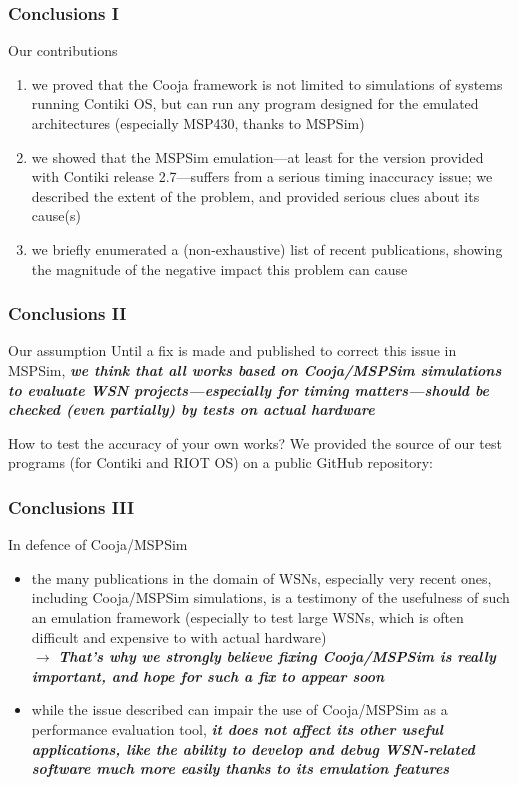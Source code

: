 \documentclass[10pt,c]{beamer}
\renewcommand{\emph}[1]{\textbf{\textit{#1}}}
\begin{document}
\begin{frame}
\frametitle{Conclusions I}
\begin{block}{Our contributions}
\begin{enumerate}
\item we proved that the Cooja framework is not limited to simulations
of systems running Contiki OS, but can run any program designed for the
emulated architectures (especially MSP430, thanks to MSPSim)
\item we showed that the MSPSim emulation---at least for the version
provided with Contiki release 2.7---suffers from a serious timing inaccuracy
issue; we described the extent of the problem, and provided serious clues
about its cause(s)
\item we briefly enumerated a (non-exhaustive) list of recent publications,
showing the magnitude of the negative impact this problem can cause
\end{enumerate}
\end{block}
\end{frame}

\begin{frame}
\frametitle{Conclusions II}
\begin{alertblock}{Our assumption}
Until a fix is made and published to correct this issue in MSPSim,
\emph{we think that all works based on Cooja/MSPSim simulations to evaluate
WSN projects---especially for timing matters---should be checked (even
partially) by tests on actual hardware}
\end{alertblock}
\begin{exampleblock}{How to test the accuracy of your own works?}
We provided the source of our test programs (for Contiki and RIOT OS)
on a public GitHub repository:
\end{exampleblock}
\end{frame}

\begin{frame}
\frametitle{Conclusions III}
\begin{exampleblock}{In defence of Cooja/MSPSim}
\begin{itemize}
\item the many publications in the domain of WSNs, especially very recent
ones, including Cooja/MSPSim simulations, is a testimony of the usefulness
of such an emulation framework (especially to test large WSNs, which is
often difficult and expensive to with actual hardware) \\
$\rightarrow$ \emph{That's why we strongly believe fixing Cooja/MSPSim
is really important, and hope for such a fix to appear soon}
\item while the issue described can impair the use of Cooja/MSPSim as
a performance evaluation tool, \emph{it does not affect its other useful
applications, like the ability to develop and debug WSN-related software
much more easily thanks to its emulation features}
\end{itemize}
\end{exampleblock}
\end{frame}
\end{document}
